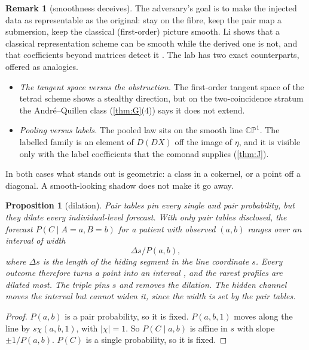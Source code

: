 \documentclass[11pt]{article}
\newtheorem{proposition}{Proposition}\newtheorem{corollary}{Corollary}\newtheorem{lemma}{Lemma}
\theoremstyle{definition}\newtheorem{definition}{Definition}\newtheorem{remark}{Remark}
\begin{document}
\begin{remark}[smoothness deceives]
The adversary's goal is to make the injected data as representable as the original: stay on the fibre, keep the pair map a submersion,
keep the classical (first-order) picture smooth. Li shows that a classical representation scheme can be smooth while the derived one
is not, and that coefficients beyond matrices detect it \cite{Li2026}. The lab has two exact counterparts, offered as analogies.
\begin{itemize}
\item \emph{The tangent space versus the obstruction.} The first-order tangent space of the tetrad scheme shows a stealthy direction,
  but on the two-coincidence stratum the André--Quillen class (\cref{thm:G}(4)) says it does not extend.
\item \emph{Pooling versus labels.} The pooled law sits on the smooth line $\mathbb{CP}^1$. The labelled family is an element of $D(DX)$ off
  the image of $\eta$, and it is visible only with the label coefficients that the comonad supplies (\cref{thm:J}).
\end{itemize}
In both cases what stands out is geometric: a class in a cokernel, or a point off a diagonal. A smooth-looking shadow does not make it
go away.
\end{remark}

\begin{proposition}[dilation]\label{prop:dilation}
Pair tables pin every single and pair probability, but they dilate every individual-level forecast. With only pair tables disclosed, the
forecast $P(C\mid A=a,B=b)$ for a patient with observed $(a,b)$ ranges over an interval of width
\[
\Delta s/P(a,b),
\]
where $\Delta s$ is the length of the hiding segment in the line coordinate $s$. Every outcome therefore turns a point into an interval
\cite{SeidenfeldWasserman1993}, and the rarest profiles are dilated most. The triple pins $s$ and removes the dilation. The hidden
channel moves the interval but cannot widen it, since the width is set by the pair tables.
\end{proposition}

\begin{proof}
$P(a,b)$ is a pair probability, so it is fixed. $P(a,b,1)$ moves along the line by $s\chi(a,b,1)$, with $|\chi|=1$. So $P(C\mid a,b)$ is
affine in $s$ with slope $\pm1/P(a,b)$. $P(C)$ is a single probability, so it is fixed.
\end{proof}
\end{document}
